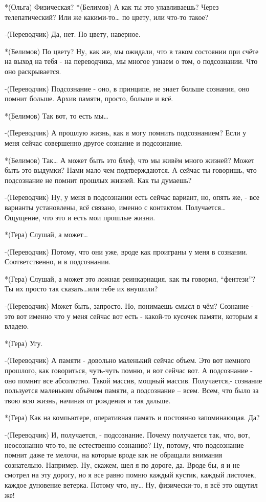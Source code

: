 *(Ольга) Физическая?
*(Белимов) А как ты это улавливаешь? Через телепатический? Или же какими-то… по цвету, или что-то такое?

-(Переводчик) Да, нет. По цвету, наверное.

*(Белимов) По цвету? Ну, как же, мы ожидали, что в таком состоянии при счёте на выход на тебя - на переводчика, мы многое узнаем о том, о подсознании. Что оно раскрывается.

-(Переводчик) Подсознание  - оно, в принципе, не знает больше сознания, оно помнит больше. Архив памяти, просто, больше и всё.

*(Белимов) Так вот, то есть мы…

-(Переводчик) А прошлую жизнь, как я могу помнить подсознанием? Если у меня сейчас совершенно другое сознание и подсознание.

*(Белимов) Так… А может быть это блеф, что мы живём много жизней? Может быть это выдумки? Нами мало чем подтверждаются. А сейчас ты говоришь, что подсознание не помнит прошлых жизней. Как ты думаешь?

-(Переводчик) Ну, у меня в подсознании есть сейчас вариант, но, опять же, - все варианты установлены, всё связано, именно с контактом. Получается… Ощущение, что это и есть мои прошлые жизни.

*(Гера) Слушай, а может…

-(Переводчик) Потому, что они уже, вроде как проиграны у меня в сознании. Соответственно, и в подсознании.

*(Гера) Слушай, а может это ложная реинкарнация, как ты говорил, “фентези”? Ты их просто так сказать…или тебе их внушили?

-(Переводчик) Может быть, запросто. Но, понимаешь смысл в чём? Сознание - это вот именно что у меня сейчас вот есть - какой-то кусочек памяти, которым я владею. 

*(Гера) Угу.

-(Переводчик) А памяти - довольно маленький сейчас объем. Это вот немного прошлого, как говориться, чуть-чуть помню, и вот сейчас вот. А подсознание - оно помнит все абсолютно. Такой массив, мощный массив. Получается,- сознание пользуется маленьким объёмом памяти, а  подсознание – всем. Всем, что было за твою всю жизнь, начиная от рождения и так дальше.

*(Гера) Как на компьютере, оперативная память и постоянно запоминающая. Да?

-(Переводчик) И, получается, - подсознание. Почему получается так, что, вот, неосознанно что-то, не естественно сознанию? Ну, потому, что подсознание помнит даже те мелочи, на которые вроде как не обращали внимания сознательно. Например. Ну, скажем, шел я по дороге, да. Вроде бы, я и не смотрел на эту дорогу, но я все равно помню каждый кустик, каждый листочек, каждое дуновение ветерка. Потому что, ну… Ну, физически-то, я всё это ощутил же!


